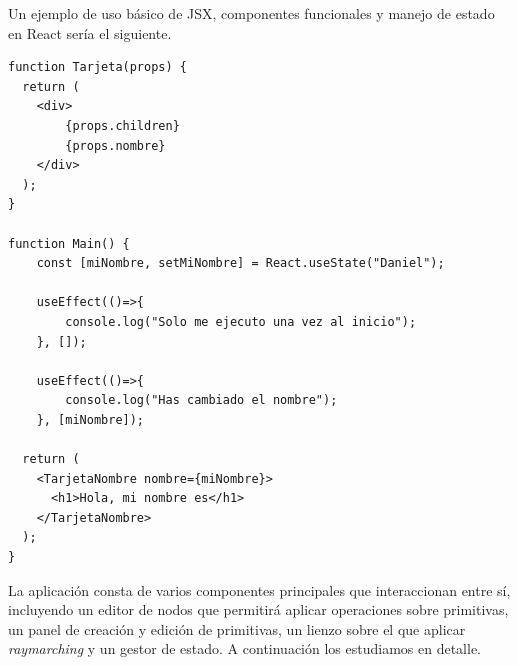 Un ejemplo de uso básico de JSX, componentes funcionales y manejo de estado en React sería el siguiente.
\begin{lstlisting}
function Tarjeta(props) {
  return (
    <div>
        {props.children}
        {props.nombre}
    </div>
  );
}

function Main() {
    const [miNombre, setMiNombre] = React.useState("Daniel");

    useEffect(()=>{
        console.log("Solo me ejecuto una vez al inicio");
    }, []);
    
    useEffect(()=>{
        console.log("Has cambiado el nombre");
    }, [miNombre]);
    
  return (
    <TarjetaNombre nombre={miNombre}>
      <h1>Hola, mi nombre es</h1>
    </TarjetaNombre>
  );
}
\end{lstlisting}

La aplicación consta de varios componentes principales que interaccionan entre sí, incluyendo un editor de nodos que permitirá aplicar operaciones sobre primitivas, un panel de creación y edición de primitivas, un lienzo sobre el que aplicar \textit{raymarching} y un gestor de estado. A continuación los estudiamos en detalle.

